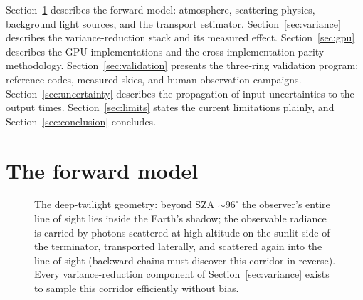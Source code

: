 \documentclass[preprint,12pt]{elsarticle}
\begin{document}
Section~\ref{sec:model} describes the forward model: atmosphere,
scattering physics, background light sources, and the transport estimator.
Section~\ref{sec:variance} describes the variance-reduction stack and its
measured effect. Section~\ref{sec:gpu} describes the GPU implementations
and the cross-implementation parity methodology.
Section~\ref{sec:validation} presents the three-ring validation program:
reference codes, measured skies, and human observation campaigns.
Section~\ref{sec:uncertainty} describes the propagation of input
uncertainties to the output times. Section~\ref{sec:limits} states the
current limitations plainly, and Section~\ref{sec:conclusion} concludes.

\section{The forward model}
\label{sec:model}

\begin{figure}[t]
\centering
{}
\caption{The deep-twilight geometry: beyond SZA ${\sim}96^{\circ}$ the
observer's entire line of sight lies inside the Earth's shadow; the
observable radiance is carried by photons scattered at high altitude
on the sunlit side of the terminator, transported laterally, and
scattered again into the line of sight (backward chains must discover
this corridor in reverse). Every variance-reduction component of
Section~\ref{sec:variance} exists to sample this corridor efficiently
without bias.}
\label{fig:geometry}
\end{figure}
\end{document}
